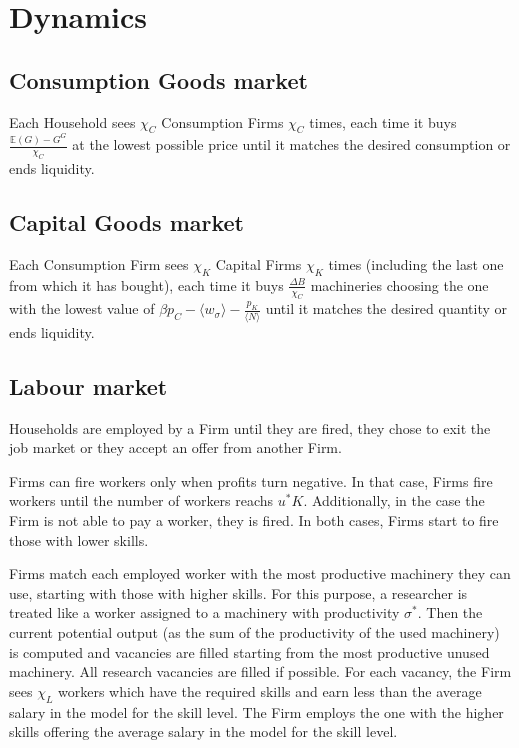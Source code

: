 \documentclass[a4paper, headings=standardclasses]{scrartcl}
\begin{document}
\section{Dynamics}
\subsection{Consumption Goods market}
Each Household sees $\chi_C$ Consumption Firms $\chi_C$ times, each time it buys $\frac{\mathbb{E}(G) - G^G}{\chi_C}$ at the lowest possible price until it matches the desired consumption or ends liquidity.

\subsection{Capital Goods market}
Each Consumption Firm sees $\chi_K$ Capital Firms $\chi_K$ times (including the last one from which it has bought), each time it buys $\frac{\Delta B}{\chi_C}$ machineries choosing the one with the lowest value of $\beta p_C - \langle w_\sigma \rangle - \frac{p_K}{\langle N \rangle}$ until it matches the desired quantity or ends liquidity.

\subsection{Labour market}
Households are employed by a Firm until they are fired, they chose to exit the job market or they accept an offer from another Firm.

Firms can fire workers only when profits turn negative. In that case, Firms fire workers until the number of workers reachs $u^* K$. Additionally, in the case the Firm is not able to pay a worker, they is fired. In both cases, Firms start to fire those with lower skills.

Firms match each employed worker with the most productive machinery they can use, starting with those with higher skills. For this purpose, a researcher is treated like a worker assigned to a machinery with productivity $\sigma^*$.
Then the current potential output (as the sum of the productivity of the used machinery) is computed and vacancies are filled starting from the most productive unused machinery. All research vacancies are filled if possible.
For each vacancy, the Firm sees $\chi_L$ workers which have the required skills and earn less than the average salary in the model for the skill level. The Firm employs the one with the higher skills offering the average salary in the model for the skill level.
\end{document}
